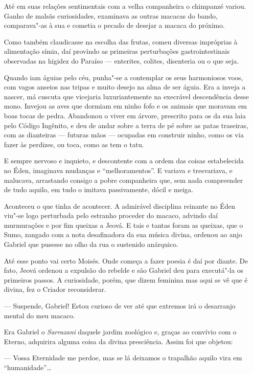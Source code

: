 Até em suas relações sentimentais com a velha companheira o chimpanzé
variou. Ganho de malsãs curiosidades, examinava as outras macacas do
bando, comparava"-as à sua e cometia o pecado de desejar a macaca do
próximo.

Como também claudicasse na escolha das frutas, comeu diversas impróprias
à alimentação símia, daí provindo as primeiras perturbações
gastrointestinais observadas na higidez do Paraíso --- enterites,
colites, disenteria ou o que seja.

Quando iam águias pelo céu, punha"-se a contemplar os seus harmoniosos
voos, com vagos anseios nas tripas e muito desejo na alma de ser águia.
Era a inveja a nascer, má cuscuta que vicejaria luxuriantemente na
execrável descendência desse mono. Invejou as aves que dormiam em ninho
fofo e os animais que moravam em boas tocas de pedra. Abandonou o viver
em árvore, prescrito para os da sua laia pelo Código Ingênito, e deu de
andar sobre a terra de pé sobre as patas traseiras, com as dianteiras
--- futuras mãos --- ocupadas em construir ninho, como os via fazer às
perdizes, ou toca, como as tem o tatu.

E sempre nervoso e inquieto, e descontente com a ordem das coisas
estabelecida no Éden, imaginava mudanças e ``melhoramentos''. E variava
e tresvariava, e malucava, arrastando consigo a pobre companheira que,
sem nada compreender de tudo aquilo, em tudo o imitava passivamente,
dócil e meiga.

Aconteceu o que tinha de acontecer. A admirável disciplina reinante no
Éden viu"-se logo perturbada pelo estranho proceder do macaco, advindo
daí murmurações e por fim queixas a Jeová. E tais e tantas foram as
queixas, que o Sumo, zangado com a nota desafinadora da sua música
divina, ordenou ao anjo Gabriel que pusesse no olho da rua o sustenido
anárquico.

Até esse ponto vai certo Moisés. Onde começa a fazer poesia é daí por
diante. De fato, Jeová ordenou a expulsão do rebelde e são Gabriel deu
para executá"-la os primeiros passos. A curiosidade, porém, que dizem
feminina mas aqui se vê que é divina, fez o Criador reconsiderar.

--- Suspende, Gabriel! Estou curioso de ver até que extremos irá o
desarranjo mental do meu macaco.

Era Gabriel o \emph{Sarrazani} daquele jardim zoológico e, graças ao
convívio com o Eterno, adquirira alguma coisa da divina presciência.
Assim foi que objetou:

--- Vossa Eternidade me perdoe, mas se lá deixamos o trapalhão aquilo
vira em ``humanidade''\ldots{}


